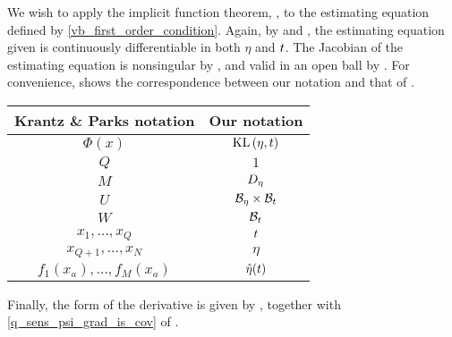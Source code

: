 We wish to apply the implicit function theorem, \citet[Theorem
3.3.1]{krantz:2012:implicit}, to the estimating equation defined by
\eqref{vb_first_order_condition}. Again, by 
and , the estimating equation given is continuously
differentiable in both $\eta$ and $t$. The Jacobian of the estimating equation
is nonsingular by , and valid in an open ball by
. For convenience,
 shows the correspondence between our notation and that
of \citet[Theorem 3.3.1]{krantz:2012:implicit}.

\begin{center}
\begin{tabular}{|c|c|}
%
\hline Krantz \& Parks notation & Our notation \\\hline
$\Phi(x)$                       & $\mathrm{KL}\left(\eta, t\right)$ \\\hline
$Q$                             & $1$ \\\hline
$M$                             & ${D_{\eta}}$ \\\hline
$U$                             & $\mathcal{B}_\eta \times \mathcal{B}_t$ \\\hline
$W$                             & $\mathcal{B}_t$ \\\hline
$x_1,\ldots,x_Q$                & $t$ \\\hline
$x_{Q+1},\ldots,x_N$            & $\eta$ \\\hline
$f_1(x_a), \ldots,f_M(x_a)$     & $\hat\eta(t)$ \\\hline
%
\end{tabular}
\end{center}

Finally, the form of the derivative is given by \citet[Theorem
3.3.1]{krantz:2012:implicit}, together with \eqref{q_sens_psi_grad_is_cov} of
.
%

\vspace{1em}

%

